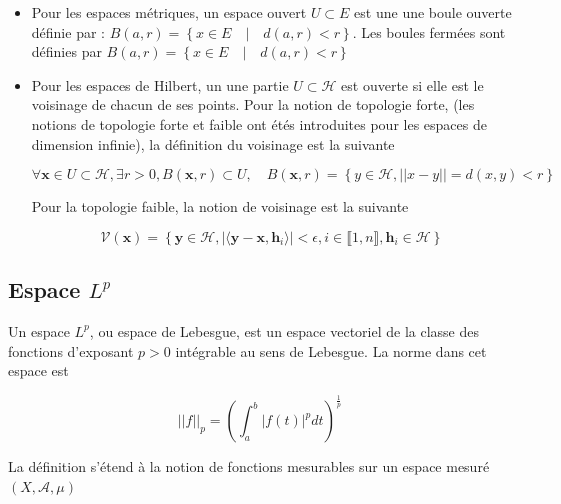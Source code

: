\begin{itemize}
    \item Pour les espaces métriques, un espace ouvert $U \subset E$ est une une boule ouverte définie par : $B(a, r) = \left\{ x \in E \quad | \quad d(a,r) < r \right\}$. Les boules fermées sont définies par $B(a, r) = \left\{ x \in E \quad | \quad d(a,r) < r \right\}$ \newline

    \item Pour les espaces de Hilbert, un une partie $U \subset \mathcal{H}$ est ouverte si elle est le voisinage de chacun de ses points. Pour la notion de topologie forte, (les notions de topologie forte et faible ont étés introduites pour les espaces de dimension infinie), la définition du voisinage est la suivante
    
    \begin{equation}
        \forall \boldsymbol{x} \in U \subset \mathcal{H}, \exists r > 0, B(\boldsymbol{x}, r) \subset U, \quad B(\boldsymbol{x}, r) = \left\{ y \in \mathcal{H}, ||x - y|| = d(x,y) < r \right\}
    \end{equation}

    \noindent Pour la topologie faible, la notion de voisinage est la suivante

    \begin{equation}
        \boldsymbol{\mathcal{V}}(\boldsymbol{x}) = \left\{ \boldsymbol{y} \in \mathcal{H}, | \langle \boldsymbol{y} - \boldsymbol{x}, \boldsymbol{h}_i \rangle | < \epsilon, i \in \llbracket 1,n \rrbracket, \boldsymbol{h}_i \in \mathcal{H} \right\}
    \end{equation}

\end{itemize}

\subsection{Espace $L^p$}

\noindent Un espace $L^{p}$, ou espace de Lebesgue, est un espace vectoriel de la classe des fonctions d'exposant $p > 0$ intégrable au sens de Lebesgue. La norme dans cet espace est 

\begin{equation}
    ||f||_{p} = \left( \int_{a}^{b} |f(t)|^{p} dt \right)^{\frac{1}{p}}
\end{equation}

\noindent La définition s'étend à la notion de fonctions mesurables sur un espace mesuré $(X, \mathcal{A}, \mu)$

